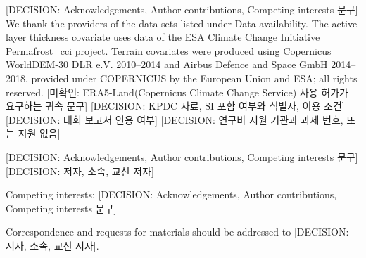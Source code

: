 \fi

\ifnum{}\relax


[DECISION: Acknowledgements, Author contributions, Competing interests 문구] We thank the providers of the data sets listed under Data availability. The active-layer thickness covariate uses data of the ESA Climate Change Initiative Permafrost\_cci project. Terrain covariates were produced using Copernicus WorldDEM-30 \textcopyright{} DLR e.V. 2010--2014 and \textcopyright{} Airbus Defence and Space GmbH 2014--2018, provided under COPERNICUS by the European Union and ESA; all rights reserved. [미확인: ERA5-Land(Copernicus Climate Change Service) 사용 허가가 요구하는 귀속 문구] [DECISION: KPDC 자료, SI 포함 여부와 식별자, 이용 조건] [DECISION: 대회 보고서 인용 여부] [DECISION: 연구비 지원 기관과 과제 번호, 또는 지원 없음]



[DECISION: Acknowledgements, Author contributions, Competing interests 문구] [DECISION: 저자, 소속, 교신 저자]



Competing interests: [DECISION: Acknowledgements, Author contributions, Competing interests 문구]

Correspondence and requests for materials should be addressed to [DECISION: 저자, 소속, 교신 저자].

\fi
